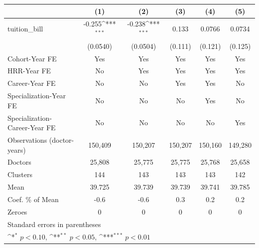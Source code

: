{
\def\sym#1{\ifmmode^{#1}\else\(^{#1}\)\fi}
\begin{tabular}{l*{5}{c}}
\hline\hline
                    &\multicolumn{1}{c}{(1)}         &\multicolumn{1}{c}{(2)}         &\multicolumn{1}{c}{(3)}         &\multicolumn{1}{c}{(4)}         &\multicolumn{1}{c}{(5)}         \\
\hline
tuition\_bill        &      -0.255\sym{***}&      -0.238\sym{***}&       0.133         &      0.0766         &      0.0734         \\
                    &    (0.0540)         &    (0.0504)         &     (0.111)         &     (0.121)         &     (0.125)         \\
[1em]
Cohort-Year FE      &         Yes         &         Yes         &         Yes         &         Yes         &         Yes         \\
[1em]
HRR-Year FE         &          No         &         Yes         &         Yes         &         Yes         &         Yes         \\
[1em]
Career-Year FE      &          No         &          No         &         Yes         &         Yes         &          No         \\
[1em]
Specialization-Year FE&          No         &          No         &          No         &         Yes         &          No         \\
[1em]
Specialization-Career-Year FE&          No         &          No         &          No         &          No         &         Yes         \\
\hline
Observations (doctor-years)&     150,409         &     150,207         &     150,207         &     150,160         &     149,280         \\
Doctors             &      25,808         &      25,775         &      25,775         &      25,768         &      25,658         \\
Clusters            &         144         &         143         &         143         &         143         &         142         \\
Mean                &      39.725         &      39.739         &      39.739         &      39.741         &      39.785         \\
Coef. \% of Mean    &        -0.6         &        -0.6         &         0.3         &         0.2         &         0.2         \\
Zeroes              &           0         &           0         &           0         &           0         &           0         \\
\hline\hline
\multicolumn{6}{l}{\footnotesize Standard errors in parentheses}\\
\multicolumn{6}{l}{\footnotesize \sym{*} \(p<0.10\), \sym{**} \(p<0.05\), \sym{***} \(p<0.01\)}\\
\end{tabular}
}
